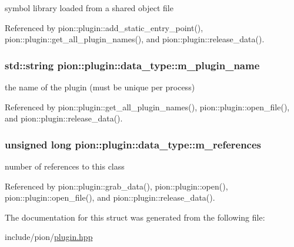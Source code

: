 symbol library loaded from a shared object file 



Referenced by pion\-::plugin\-::add\-\_\-static\-\_\-entry\-\_\-point(), pion\-::plugin\-::get\-\_\-all\-\_\-plugin\-\_\-names(), and pion\-::plugin\-::release\-\_\-data().

\hypertarget{structpion_1_1plugin_1_1data__type_a9ae35daeb06cf5f00675ff690d37db69}{
\subsubsection[{m\-\_\-plugin\-\_\-name}]{\setlength{\rightskip}{0pt plus 5cm}std\-::string pion\-::plugin\-::data\-\_\-type\-::m\-\_\-plugin\-\_\-name}}\label{structpion_1_1plugin_1_1data__type_a9ae35daeb06cf5f00675ff690d37db69}


the name of the plugin (must be unique per process) 



Referenced by pion\-::plugin\-::get\-\_\-all\-\_\-plugin\-\_\-names(), pion\-::plugin\-::open\-\_\-file(), and pion\-::plugin\-::release\-\_\-data().

\hypertarget{structpion_1_1plugin_1_1data__type_a2536d38120032c485b556d174ad46013}{
\subsubsection[{m\-\_\-references}]{\setlength{\rightskip}{0pt plus 5cm}unsigned long pion\-::plugin\-::data\-\_\-type\-::m\-\_\-references}}\label{structpion_1_1plugin_1_1data__type_a2536d38120032c485b556d174ad46013}


number of references to this class 



Referenced by pion\-::plugin\-::grab\-\_\-data(), pion\-::plugin\-::open(), pion\-::plugin\-::open\-\_\-file(), and pion\-::plugin\-::release\-\_\-data().



The documentation for this struct was generated from the following file\-:\begin{DoxyCompactItemize}
\item 
include/pion/\hyperlink{plugin_8hpp}{plugin.\-hpp}\end{DoxyCompactItemize}
